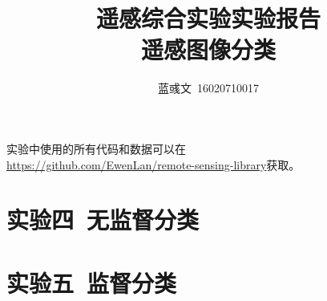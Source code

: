 \documentclass[hyperref, UTF8]{ctexart}
\title{遥感综合实验实验报告\\遥感图像分类}
\author{蓝彧文~16020710017}
\begin{document}
	\maketitle
	\tableofcontents
	\newpage
	实验中使用的所有代码和数据可以在\\ \url{https://github.com/EwenLan/remote-sensing-library}获取。
	\section{实验四~无监督分类}
	
	\section{实验五~监督分类}
	
\end{document}
